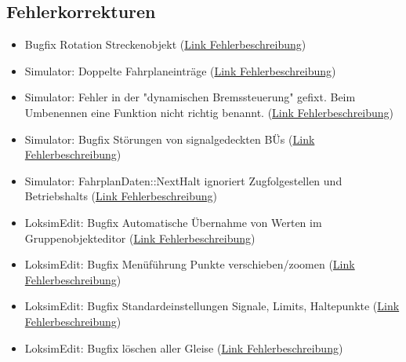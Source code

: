 \subsection{Fehlerkorrekturen}
\begin{itemize}
    \item Bugfix Rotation Streckenobjekt (\href{https://www.loksimulatoren.de/forum/index.php?thread/8430-gedrehte-streckenobjekte-ab-dem-2-modul-in-der-kbs-unsichtbar/}{Link Fehlerbeschreibung})
    \item Simulator: Doppelte Fahrplaneinträge (\href{https://www.loksimulatoren.de/forum/index.php?thread/8441-fehler-ebula-doppelte-haltepunkte-und-geschwindigkeitsanzeige/}{Link Fehlerbeschreibung})
    \item Simulator: Fehler in der "dynamischen Bremssteuerung" gefixt. Beim Umbenennen eine Funktion nicht richtig benannt. (\href{https://www.loksimulatoren.de/forum/index.php?thread/8442-dynamische-bremse-br427-428/&postID=137094#post137094}{Link Fehlerbeschreibung})
    \item Simulator: Bugfix Störungen von signalgedeckten BÜs (\href{https://www.loksimulatoren.de/forum/index.php?thread/5771-probleme-mit-durch-hauptsignale-%C3%BCberwachten-b%C3%BC/&postID=137100#post137100}{Link Fehlerbeschreibung})
    \item Simulator: FahrplanDaten::NextHalt ignoriert Zugfolgestellen und Betriebshalts (\href{https://www.loksimulatoren.de/forum/index.php?thread/5768-zza-anzeigen-falsch-wenn-hp-nur-als-zugfolgestelle-gekennzeichnet-ist/}{Link Fehlerbeschreibung})
    \item LoksimEdit: Bugfix Automatische Übernahme von Werten im Gruppenobjekteditor (\href{https://www.loksimulatoren.de/forum/index.php?thread/8262-speichern-von-%C3%A4nderungen-in-gruppenobjekten/}{Link Fehlerbeschreibung})
    \item LoksimEdit: Bugfix Menüführung Punkte verschieben/zoomen (\href{https://www.loksimulatoren.de/forum/index.php?thread/8431-fehler-der-men%C3%BCf%C3%BChrung-beim-verschieben-zoomen-von-objekten-im-gruppenobjektedit/}{Link Fehlerbeschreibung})
    \item LoksimEdit: Bugfix Standardeinstellungen Signale, Limits, Haltepunkte (\href{https://www.loksimulatoren.de/forum/index.php?thread/8435-standard-einstellungen-bei-signalen-werden-auch-bei-abbruch-gesetzt/}{Link Fehlerbeschreibung})
    \item LoksimEdit: Bugfix löschen aller Gleise (\href{https://www.loksimulatoren.de/forum/index.php?thread/8434-fehler-bei-l%C3%B6schen-des-letzten-gleises-einer-strecke/}{Link Fehlerbeschreibung})
\end{itemize}

